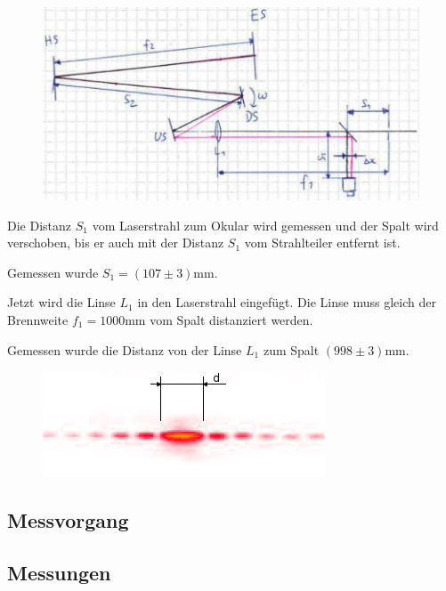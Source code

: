 \begin{figure}[H]
    \center
    \includegraphics[width=\textwidth]{images/setup.pdf}
    \caption{}
    \label{fig:setup}
\end{figure}

Die Distanz $S_1$ vom Laserstrahl zum Okular wird gemessen und der Spalt wird
verschoben, bis er auch mit der Distanz $S_1$ vom Strahlteiler entfernt ist.

Gemessen wurde $S_1 = (107\pm3)\textrm{mm}$.

Jetzt  wird die  Linse $L_1$  in den  Laserstrahl eingef\"ugt. Die  Linse muss
gleich der Brennweite $f_1 = 1000\textrm{mm}$ vom Spalt distanziert werden.

Gemessen wurde die Distanz von der Linse $L_1$ zum Spalt $(998\pm3)\textrm{mm}$.

\begin{figure}[H]
    \center
    \includegraphics[width=.9\textwidth]{images/diffraction.png}
    \caption{}
    \label{fig:diffraction}
\end{figure}


\subsection{Messvorgang}

\subsection{Messungen}

